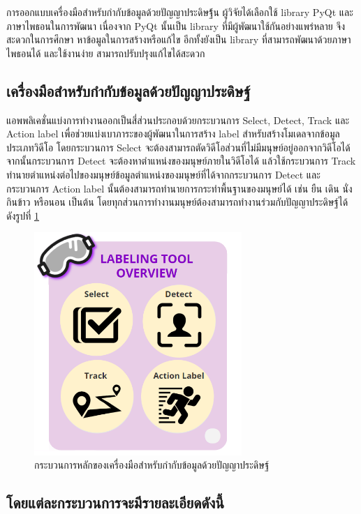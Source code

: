 การออกแบบเครื่องมือสำหรับกำกับข้อมูลด้วยปัญญาประดิษฐ์้น ผู้วิจัยได้เลือกใช้ library PyQt และภาษาไพธอนในการพัฒนา
เนื่องจาก PyQt นั้นเป็น library ที่มีผู้พัฒนาใช้กันอย่างแพร่หลาย จึงสะดวกในการศึกษา หาข้อมูลในการสร้างหรือแก้ไข
อีกทั้งยังเป็น library ที่สามารถพัฒนาด้วยภาษาไพธอนได้ และใช้งานง่าย สามารถปรับปรุงแก้ไขได้สะดวก

\subsection{เครื่องมือสำหรับกำกับข้อมูลด้วยปัญญาประดิษฐ์}
แอพพลิเคชั่นแบ่งการทำงานออกเป็นสี่ส่วนประกอบด้วยกระบวนการ Select, Detect, Track และ Action label
เพื่อช่วยแบ่งเบาภาระของผู้พัฒนาในการสร้าง label สำหรับสร้างโมเดลจากข้อมูลประเภทวิดีโอ โดยกระบวนการ Select
จะต้องสามารถตัดวิดีโอส่วนที่ไม่มีมนุษย์อยู่ออกจากวิดีโอได้ จากนั้นกระบวนการ Detect จะต้องหาตำแหน่งของมนุษย์ภายในวิดีโอได้
แล้วใช้กระบวนการ Track ทำนายตำแหน่งต่อไปของมนุษย์ข้อมูลตำแหน่งของมนุษย์ที่ได้จากกระบวนการ Detect
และกระบวนการ Action label นั้นต้องสามารถทำนายการกระทำพื้นฐานของมนุษย์ได้ เช่น ยืน เดิน นั่ง กินข้าว หรือนอน เป็นต้น 
โดยทุกส่วนการทำงานมนุษย์ต้องสามารถทำงานร่วมกับปัญญาประดิษฐ์ได้
ดังรูปที่ \ref{fig:labeling_overview}

\begin{figure}[!ht]
    \centering
    \includegraphics[width=0.7\textwidth]{chapter3/images/3_6/labelingToolOverview.png}
    \caption{กระบวนการหลักของเครื่องมือสำหรับกำกับข้อมูลด้วยปัญญาประดิษฐ์}
    \label{fig:labeling_overview}
\end{figure}
\clearpage

\subsection*{โดยแต่ละกระบวนการจะมีรายละเอียดดังนี้}
